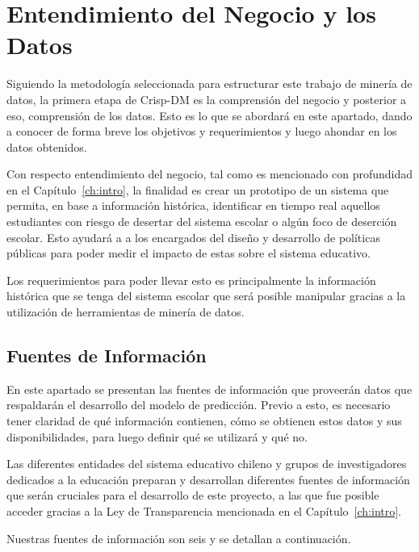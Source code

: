 \section{Entendimiento del Negocio y los Datos}
Siguiendo la metodología seleccionada para estructurar este trabajo de minería de datos, la primera etapa de Crisp-DM es la comprensión del negocio y posterior a eso, comprensión de los datos. Esto es lo que se abordará en este apartado, dando a conocer de forma breve los objetivos y requerimientos y luego ahondar en los datos obtenidos. 

Con respecto entendimiento del negocio, tal como es mencionado con profundidad en el Capítulo~\ref{ch:intro}, la finalidad es crear un prototipo de un sistema que permita, en base a información histórica, identificar en tiempo real aquellos estudiantes con riesgo de desertar del sistema escolar o algún foco de deserción escolar. Esto ayudará a a los encargados del diseño y desarrollo de políticas públicas para poder medir el impacto de estas sobre el sistema educativo.

Los requerimientos para poder llevar esto es principalmente la información histórica que se tenga del sistema escolar que será posible manipular gracias a la utilización de herramientas de minería de datos.

\subsection{Fuentes de Información}
En este apartado se presentan las fuentes de información que proveerán datos que respaldarán el desarrollo del modelo de predicción. Previo a esto, es necesario tener claridad de qué información contienen, cómo se obtienen estos datos y sus disponibilidades, para luego definir qué se utilizará y qué no. %

Las diferentes entidades del sistema educativo chileno y grupos de investigadores dedicados a la educación preparan y desarrollan diferentes fuentes de información que serán cruciales para el desarrollo de este proyecto, a las que fue posible acceder gracias a la Ley de Transparencia mencionada en el Capítulo~\ref{ch:intro}. 

Nuestras fuentes de información son seis y se detallan a continuación. 


